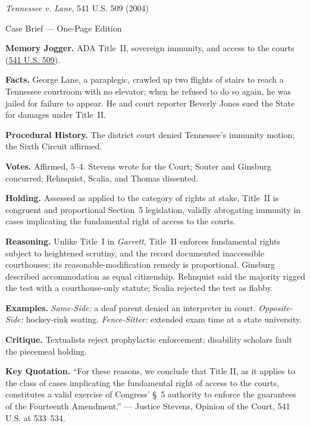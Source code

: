 \documentclass[12pt]{article}
\begin{document}
\begin{center}
{\Large \textit{Tennessee v. Lane}, 541 U.S. 509 (2004)\par}
\vspace{0.3em}
{\normalsize Case Brief --- One-Page Edition\par}
\end{center}

\textbf{Memory Jogger.} ADA Title~II, sovereign immunity, and access to the courts (\href{https://www.law.cornell.edu/supremecourt/text/541/509}{541 U.S. 509}).

\textbf{Facts.} George Lane, a paraplegic, crawled up two flights of stairs to reach a Tennessee courtroom with no elevator; when he refused to do so again, he was jailed for failure to appear. He and court reporter Beverly Jones sued the State for damages under Title~II.

\textbf{Procedural History.} The district court denied Tennessee's immunity motion; the Sixth Circuit affirmed.

\textbf{Votes.} Affirmed, 5--4. Stevens wrote for the Court; Souter and Ginsburg concurred; Rehnquist, Scalia, and Thomas dissented.

\textbf{Holding.} Assessed as applied to the category of rights at stake, Title~II is congruent and proportional Section~5 legislation, validly abrogating immunity in cases implicating the fundamental right of access to the courts.

\textbf{Reasoning.} Unlike Title~I in \textit{Garrett}, Title~II enforces fundamental rights subject to heightened scrutiny, and the record documented inaccessible courthouses; its reasonable-modification remedy is proportional. Ginsburg described accommodation as equal citizenship. Rehnquist said the majority rigged the test with a courthouse-only statute; Scalia rejected the test as flabby.

\textbf{Examples.} \emph{Same-Side:} a deaf parent denied an interpreter in court. \emph{Opposite-Side:} hockey-rink seating. \emph{Fence-Sitter:} extended exam time at a state university.

\textbf{Critique.} Textualists reject prophylactic enforcement; disability scholars fault the piecemeal holding.

\textbf{Key Quotation.} ``For these reasons, we conclude that Title II, as it applies to the class of cases implicating the fundamental right of access to the courts, constitutes a valid exercise of Congress' \S~5 authority to enforce the guarantees of the Fourteenth Amendment.'' --- Justice Stevens, Opinion of the Court, 541 U.S. at 533--534.
\end{document}
